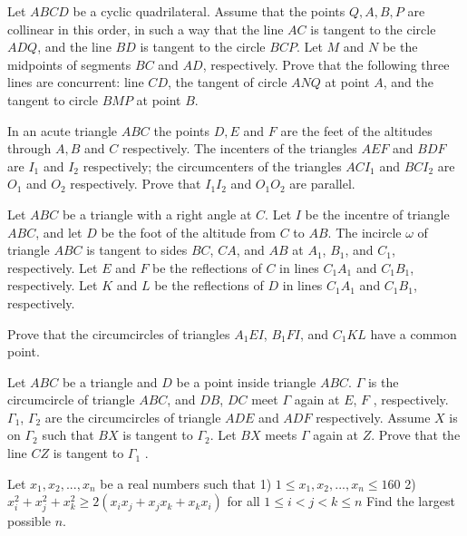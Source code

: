 \documentclass[11pt]{scrartcl}
\begin{document}
\begin{problem}[6193947856984766386]
Let $ABCD$ be a cyclic quadrilateral. Assume that the points $Q, A, B, P$ are collinear in this order, in such a way that the line $AC$ is tangent to the circle $ADQ$, and the line $BD$ is tangent to the circle $BCP$. Let $M$ and $N$ be the midpoints of segments $BC$ and $AD$, respectively. Prove that the following three lines are concurrent: line $CD$, the tangent of circle $ANQ$ at point $A$, and the tangent to circle $BMP$ at point $B$.
\end{problem}
\begin{problem}[6195404266254375127]
	In an acute triangle $ABC$ the points $D,E$ and $F$ are the feet of the altitudes through $A,B$ and $C$ respectively. The incenters of the triangles $AEF$ and $BDF$ are $I_1$ and $I_2$ respectively; the circumcenters of the triangles $ACI_1$ and $BCI_2$ are $O_1$ and $O_2$ respectively. Prove that $I_1I_2$ and $O_1O_2$ are parallel.
\end{problem}
\begin{problem}[6206024898840097202]
Let $ABC$ be a triangle with a right angle at $C$. Let $I$ be the incentre of triangle $ABC$, and let $D$ be the foot of the altitude from $C$ to $AB$. The incircle $\omega$ of triangle $ABC$ is tangent to sides $BC$, $CA$, and $AB$ at $A_1$, $B_1$, and $C_1$, respectively. Let $E$ and $F$ be the reflections of $C$ in lines $C_1A_1$ and $C_1B_1$, respectively. Let $K$ and $L$ be the reflections of $D$ in lines $C_1A_1$ and $C_1B_1$, respectively.

Prove that the circumcircles of triangles $A_1EI$, $B_1FI$, and $C_1KL$ have a common point.
\end{problem}
\begin{problem}[6209707374283278028]
Let $ABC$ be a triangle and $D$ be a point inside triangle $ABC$. $\Gamma$ is the circumcircle of triangle $ABC$, and $DB$, $DC$ meet $\Gamma$ again at $E$, $F$ , respectively. $\Gamma_1$, $\Gamma_2$ are the circumcircles of triangle $ADE$ and $ADF$ respectively. Assume $X$ is on $\Gamma_2$ such that $BX$ is tangent to $\Gamma_2$. Let $BX$ meets $\Gamma$ again at $Z$. Prove that the line $CZ$ is tangent to $\Gamma_1$ .
\end{problem}
\begin{problem}[6215930236982523925]
Let $x_1, x_2, ... , x_n$ be a real numbers such that
1) $1 \le x_1, x_2, ... , x_n \le 160$
2) $x^{2}_{i} + x^{2}_{j} + x^{2}_{k} \ge 2(x_ix_j + x_jx_k + x_kx_i)$ for all $1\le i < j < k \le n$
Find the largest possible $n$.
\end{problem}
\end{document}
